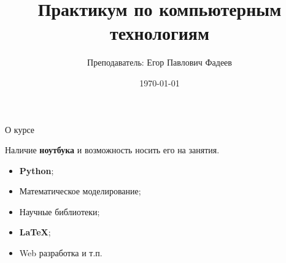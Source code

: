 \documentclass[russian, unicode, xcolor={dvipsnames}, aspectratio=43]{beamer}
\title{Практикум по компьютерным технологиям}
\author{Преподаватель: Егор Павлович Фадеев}
\institute{МГУ $\bullet$ Физический факультет $\bullet$ Кафедра математического моделирования и информатики}
\date{\today}
\begin{document}
\maketitle
	
\begin{frame}{О курсе}
	\begin{tcolorbox}[colback=red!5,colframe=red!75!black,title=Требование к студенту]
		Наличие \textbf{ноутбука} и возможность носить его на занятия.
	\end{tcolorbox}
	
	\begin{tcolorbox}[colback=black!5,colframe=violet!45!black,title=О чём курс]
		\begin{itemize}
			\item[\adv{\checkmark}] \textbf{Python};
			\item[\adv{\checkmark}] Математическое моделирование;
			\item[\adv{\checkmark}] Научные библиотеки;
			\item[\adv{\checkmark}] \textbf{\LaTeX};
			\item[\dis{$\times$}] Web разработка и т.п.
		\end{itemize}
	\end{tcolorbox}
	
		
\end{frame}
\end{document}
